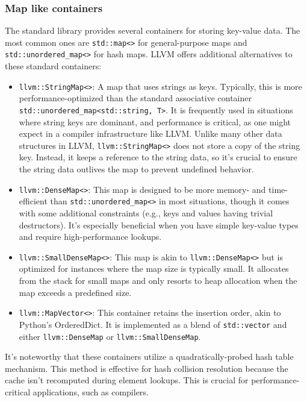 \subsubsection{Map like containers}
The standard library provides several containers for storing key-value data. The
most common ones are \texttt{std::map<>} for general-purpose maps and
\texttt{std::unordered_map<>} for hash maps. LLVM offers additional
alternatives to these standard containers: 
\begin{itemize}
\item \texttt{llvm::StringMap<>}: A map that uses strings as
  keys. Typically, this is more performance-optimized than the standard
  associative container \texttt{std::unordered_map<std::string, T>}. It
  is frequently used in situations where string keys are dominant, and
  performance is critical, as one might expect in a compiler infrastructure like
  LLVM. Unlike many other data structures in LLVM,
  \texttt{llvm::StringMap<>} does not store a copy of the string
  key. Instead, it keeps a reference to the string data, so it's crucial to
  ensure the string data outlives the map to prevent undefined behavior. 
\item \texttt{llvm::DenseMap<>}: This map is designed to be more
  memory- and time-efficient than \texttt{std::unordered_map<>} in most
  situations, though it comes with some additional constraints (e.g., keys and
  values having trivial destructors). It's especially beneficial when you have
  simple key-value types and require high-performance lookups. 
\item \texttt{llvm::SmallDenseMap<>}: This map is akin to
  \texttt{llvm::DenseMap<>} but is optimized for instances where the
  map size is typically small. It allocates from the stack for small maps and
  only resorts to heap allocation when the map exceeds a predefined size. 
\item \texttt{llvm::MapVector<>}: This container retains the insertion
  order, akin to Python's OrderedDict. It is implemented as a blend of
  \texttt{std::vector} and either \texttt{llvm::DenseMap} or
  \texttt{llvm::SmallDenseMap}.  
\end{itemize}
It's noteworthy that these containers utilize a quadratically-probed hash table
mechanism. This method is effective for hash collision resolution because the
cache isn't recomputed during element lookups. This is crucial for
performance-critical applications, such as compilers. 

